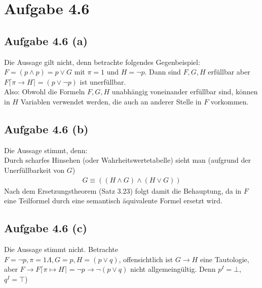 \documentclass[12pt,a4paper]{article}
\begin{document}
\section*{Aufgabe 4.6}
\subsection*{Aufgabe 4.6 (a)}
Die Aussage gilt nicht, denn betrachte folgendes Gegenbeispiel:\\
$F=(p\wedge p)=p\vee G$ mit $\pi=1$ und $H=\neg p$. Dann sind $F,G,H$ erfüllbar aber \\
$F\lceil\pi\to H\rceil=(p\vee\neg p)$ ist unerfüllbar.\\
Also: Obwohl die Formeln $F,G,H$ unabhängig voneinander erfüllbar sind, können in $H$ Variablen verwendet werden, die auch an anderer Stelle in $F$ vorkommen.

\subsection*{Aufgabe 4.6 (b)}
Die Aussage stimmt, denn:\\
Durch scharfes Hinsehen (oder Wahrheitswertetabelle) sieht man (aufgrund der Unerfüllbarkeit von $G$)
\begin{align*}
G\equiv((H\wedge G)\wedge(H\vee G))
\end{align*}
Nach dem Ersetzungstheorem (Satz 3.23) folgt damit die Behauptung, da in $F$ eine Teilformel durch eine semantisch äquivalente Formel ersetzt wird.

\subsection*{Aufgabe 4.6 (c)}
Die Aussage stimmt nicht. Betrachte\\
$F=\neg p,\pi=1\Lambda,G=p,H=(p\vee q)$, offensichtlich ist $G\to H$ eine Tautologie, aber $F\to F\lceil\pi\mapsto H\rceil=\neg p\to\neg(p\vee q)$ nicht allgemeingültig. Denn $p^I=\bot$, $q^I=\top$)

\end{document}

